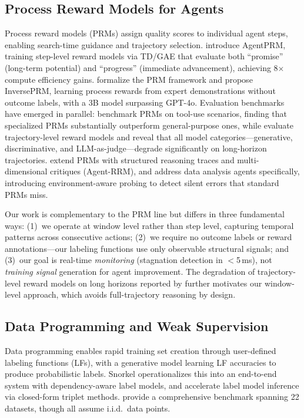\subsection{Process Reward Models for Agents}

Process reward models (PRMs) assign quality scores to individual agent steps, enabling search-time guidance and trajectory selection.
\citet{xi2025agentprm} introduce AgentPRM, training step-level reward models via TD/GAE that evaluate both ``promise'' (long-term potential) and ``progress'' (immediate advancement), achieving 8$\times$ compute efficiency gains.
\citet{choudhury2025prm} formalize the PRM framework and propose InversePRM, learning process rewards from expert demonstrations without outcome labels, with a 3B model surpassing GPT-4o.
Evaluation benchmarks have emerged in parallel: \citet{li2026toolprmbench} benchmark PRMs on tool-use scenarios, finding that specialized PRMs substantially outperform general-purpose ones, while \citet{wang2026planrewardbench} evaluate trajectory-level reward models and reveal that all model categories---generative, discriminative, and LLM-as-judge---degrade significantly on long-horizon trajectories.
\citet{fan2026agentrm} extend PRMs with structured reasoning traces and multi-dimensional critiques (Agent-RRM), and \citet{qiu2026dataprm} address data analysis agents specifically, introducing environment-aware probing to detect silent errors that standard PRMs miss.

Our work is complementary to the PRM line but differs in three fundamental ways: (1)~we operate at window level rather than step level, capturing temporal patterns across consecutive actions; (2)~we require no outcome labels or reward annotations---our labeling functions use only observable structural signals; and (3)~our goal is real-time \emph{monitoring} (stagnation detection in $<$5\,ms), not \emph{training signal} generation for agent improvement.
The degradation of trajectory-level reward models on long horizons reported by \citet{wang2026planrewardbench} further motivates our window-level approach, which avoids full-trajectory reasoning by design.

\subsection{Data Programming and Weak Supervision}

Data programming \citep{ratner2016dataprogramming} enables rapid training set creation through user-defined labeling functions (LFs), with a generative model learning LF accuracies to produce probabilistic labels.
Snorkel \citep{ratner2017snorkel} operationalizes this into an end-to-end system with dependency-aware label models, and \citet{fu2020flyingsquid} accelerate label model inference via closed-form triplet methods.
\citet{zhang2021wrench} provide a comprehensive benchmark spanning 22 datasets, though all assume i.i.d.\ data points.

